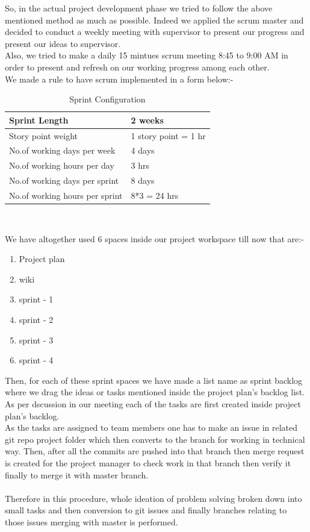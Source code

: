 \noindent
So, in the actual project development phase we tried to follow the above mentioned method as much as possible. Indeed we applied the scrum master and decided to conduct a weekly meeting with supervisor to present our progress and present our ideas to supervisor.\\

\noindent
Also, we tried to make a daily 15 mintues scrum meeting 8:45 to 9:00 AM in order to present and refresh on our working progress among each other.\\
We made a rule to have scrum implemented in a form below:-\\

\begin{table}
    \caption{Sprint Configuration}
    \centering
    \begin{tabular}{|l|l|}
        \hline
        \textbf{Sprint Length} & \textbf{2 weeks} \\
        \hline
        Story point weight & 1 story point = 1 hr \\
        \hline
        No.of working days per week & 4 days \\
        \hline
        No.of working hours per day & 3 hrs \\
        \hline
        No.of working days per sprint & 8 days \\
        \hline
        No.of working hours per sprint & 8*3 = 24 hrs \\
        \hline
    \end{tabular}\\
\end{table}

\noindent
We have altogether used 6 spaces inside our project workspace till now that are:-
\begin{enumerate}[label=\alph*.]
    \item Project plan
    \item wiki
    \item sprint - 1
    \item sprint - 2
    \item sprint - 3
    \item sprint - 4
\end{enumerate}
Then, for each of these sprint spaces we have made a list name as sprint backlog where we drag the ideas or tasks mentioned inside the project plan's backlog list. As per dscussion in our meeting each of the tasks are first created inside project plan's backlog.\\
As the tasks are assigned to team members one has to make an issue in related git repo project folder which then converts to the branch for working in technical way. Then, after all the commits are pushed into that branch then merge request is created for the project manager to check work in that branch then verify it finally to merge it with master branch.\\\\
Therefore in this procedure, whole ideation of problem solving broken down into small tasks and then conversion to git issues and finally branches relating to those issues merging with master is performed.\\ 

